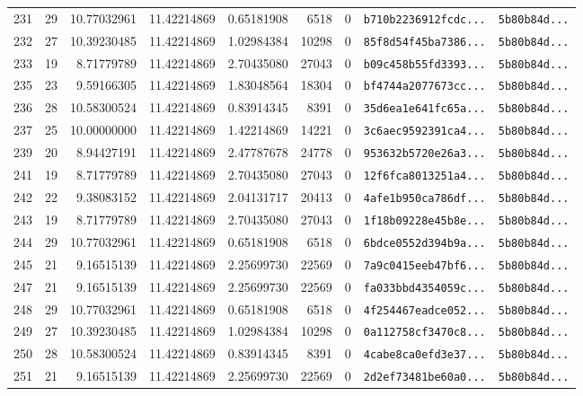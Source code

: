 \documentclass[10pt]{article}
\begin{document}
\begin{longtable}{rrrrrrrll}
  231 & 29 & 10.77032961 & 11.42214869 & 0.65181908 & 6518 & 0 & \texttt{b710b2236912fcdc...} & \texttt{5b80b84d...} \\
  232 & 27 & 10.39230485 & 11.42214869 & 1.02984384 & 10298 & 0 & \texttt{85f8d54f45ba7386...} & \texttt{5b80b84d...} \\
  233 & 19 & 8.71779789 & 11.42214869 & 2.70435080 & 27043 & 0 & \texttt{b09c458b55fd3393...} & \texttt{5b80b84d...} \\
  235 & 23 & 9.59166305 & 11.42214869 & 1.83048564 & 18304 & 0 & \texttt{bf4744a2077673cc...} & \texttt{5b80b84d...} \\
  236 & 28 & 10.58300524 & 11.42214869 & 0.83914345 & 8391 & 0 & \texttt{35d6ea1e641fc65a...} & \texttt{5b80b84d...} \\
  237 & 25 & 10.00000000 & 11.42214869 & 1.42214869 & 14221 & 0 & \texttt{3c6aec9592391ca4...} & \texttt{5b80b84d...} \\
  239 & 20 & 8.94427191 & 11.42214869 & 2.47787678 & 24778 & 0 & \texttt{953632b5720e26a3...} & \texttt{5b80b84d...} \\
  241 & 19 & 8.71779789 & 11.42214869 & 2.70435080 & 27043 & 0 & \texttt{12f6fca8013251a4...} & \texttt{5b80b84d...} \\
  242 & 22 & 9.38083152 & 11.42214869 & 2.04131717 & 20413 & 0 & \texttt{4afe1b950ca786df...} & \texttt{5b80b84d...} \\
  243 & 19 & 8.71779789 & 11.42214869 & 2.70435080 & 27043 & 0 & \texttt{1f18b09228e45b8e...} & \texttt{5b80b84d...} \\
  244 & 29 & 10.77032961 & 11.42214869 & 0.65181908 & 6518 & 0 & \texttt{6bdce0552d394b9a...} & \texttt{5b80b84d...} \\
  245 & 21 & 9.16515139 & 11.42214869 & 2.25699730 & 22569 & 0 & \texttt{7a9c0415eeb47bf6...} & \texttt{5b80b84d...} \\
  247 & 21 & 9.16515139 & 11.42214869 & 2.25699730 & 22569 & 0 & \texttt{fa033bbd4354059c...} & \texttt{5b80b84d...} \\
  248 & 29 & 10.77032961 & 11.42214869 & 0.65181908 & 6518 & 0 & \texttt{4f254467eadce052...} & \texttt{5b80b84d...} \\
  249 & 27 & 10.39230485 & 11.42214869 & 1.02984384 & 10298 & 0 & \texttt{0a112758cf3470c8...} & \texttt{5b80b84d...} \\
  250 & 28 & 10.58300524 & 11.42214869 & 0.83914345 & 8391 & 0 & \texttt{4cabe8ca0efd3e37...} & \texttt{5b80b84d...} \\
  251 & 21 & 9.16515139 & 11.42214869 & 2.25699730 & 22569 & 0 & \texttt{2d2ef73481be60a0...} & \texttt{5b80b84d...} \\

\end{longtable}
\end{document}
